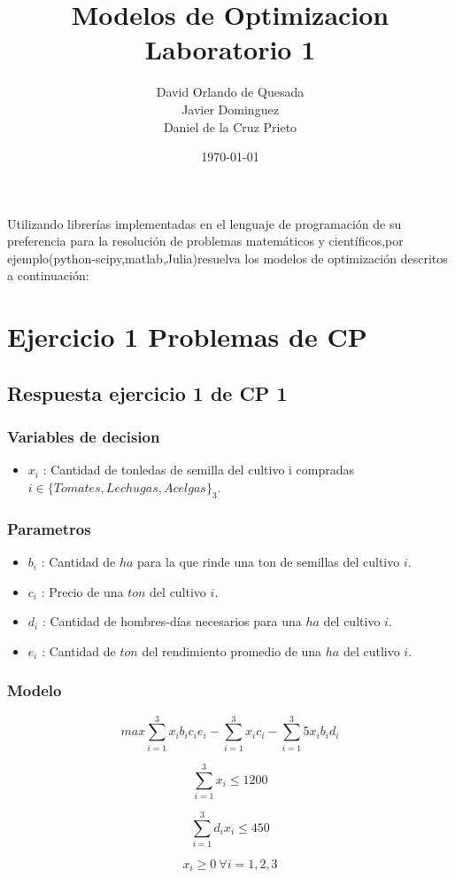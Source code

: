 \documentclass[]{article}
\begin{document}
\title{\bf  Modelos de Optimizacion Laboratorio 1}          
\author{David Orlando de Quesada \\ Javier Dominguez \\ Daniel de la Cruz Prieto   }                        
\date{\today} 

\maketitle 

Utilizando librerías implementadas en el lenguaje de programación de su preferencia para la resolución de problemas matemáticos y científicos,por ejemplo(python-scipy,matlab,Julia)resuelva los modelos de optimización descritos a continuación:


\section{Ejercicio 1 Problemas de CP} 

 \subsection{Respuesta ejercicio 1 de CP 1} 
 
 \subsubsection{Variables de decision} 
 
 \begin{itemize}
 	\item $x_i$ : Cantidad de tonledas de semilla del cultivo i compradas $i \in \{Tomates, Lechugas, Acelgas\}_3$.
 \end{itemize}
 
 
 
  \subsubsection{Parametros} 
 
 \begin{itemize}
 	 \item $b_i$ : Cantidad de $ha$ para la que rinde una ton de semillas del cultivo $i$.
 	
 	\item  $c_i$ : Precio de una $ton$ del cultivo $i$.
 	
 	\item  $d_i$ : Cantidad de hombres-d\'ias necesarios para una $ha$ del cultivo $i$.
 	
 	\item $e_i$ : Cantidad de $ton$ del rendimiento promedio de una $ha$ del cutlivo $i$.
 \end{itemize} 
   
  \subsubsection{Modelo} 

$$ max \sum_{i = 1}^3 x_i b_i c_i e_i - \sum_{i = 1}^3 x_i c_i - \sum_{i = 1}^3 5 x_i b_i d_i $$

$$ \sum_{i=1}^3 x_i \leq 1200$$

$$ \sum_{i=1}^3 d_i x_i \leq 450$$

$$ x_i \geq 0\ \forall i = 1, 2, 3$$
\end{document}
